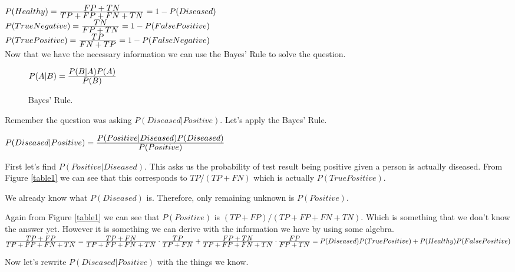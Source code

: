 \documentclass[12pt]{article}
\begin{document}
\(P(Healthy) = \frac{\displaystyle FP + TN}{\displaystyle TP + FP + FN + TN} = 1 - P(Diseased)\) \\

\(P(True Negative) = \frac{\displaystyle TN}{\displaystyle FP + TN} = 1 - P(False Positive)\) \\

\(P(True Positive) = \frac{\displaystyle TP}{\displaystyle FN + TP} = 1 - P(False Negative)\) \\

Now that we have the necessary information we can use the Bayes' Rule to solve the question.

\begin{figure}[h]
    \centering
        $ P(A|B)=\frac{\displaystyle P(B|A)P(A)}{\displaystyle P(B)}$
    \caption{Bayes' Rule.}
    \label{bayesrule}
\end{figure}

Remember the question was asking $P(Diseased|Positive)$. Let's apply the Bayes' Rule. 

\begin{center}
    $ P(Diseased|Positive)=\frac{\displaystyle P(Positive|Diseased)P(Diseased)}{\displaystyle P(Positive)}$
\end{center}

First let's find $P(Positive|Diseased)$. 
This asks us the probability of test result being positive 
given a person is actually diseased. 
From Figure \ref{table1} we can see that this corresponds to $TP /(TP + FN)$ which is actually $P(True Positive)$.

We already know what $P(Diseased)$ is. 
Therefore, only remaining unknown is $P(Positive)$.

Again from Figure \ref{table1} we can see that $P(Positive)$ is $(TP + FP)/(TP + FP + FN + TN)$. 
Which is something that we don't know the answer yet. 
However it is something we can derive with the information we have by using some algebra.\\

\begin{math}
 \ddfrac{TP + FP}{TP + FP + FN + TN} = \\\\
 \ddfrac{TP + FN}{TP + FP + FN + TN}\cdot\ddfrac{TP}{TP + FN} +
 \ddfrac{FP + TN}{TP + FP + FN + TN}\cdot\ddfrac{FP}{FP + TN} \\\newline
= P(Diseased)P(True Positive) + P(Healthy)P(False Positive)
\end{math}

\pagebreak
Now let's rewrite $P(Diseased|Positive)$ with the things we know.\\
\end{document}
